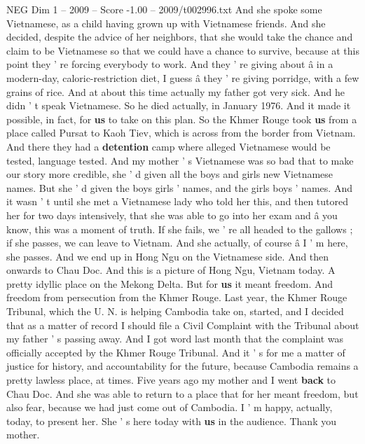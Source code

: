 \begin{textsample}{NEG Dim 1 – 2009 – Score -1.00 – 2009/t002996.txt}
And she spoke some Vietnamese, as a child having grown up with Vietnamese friends.
And she decided, despite the advice of her neighbors, that she would take the chance and claim to be Vietnamese so that we could have a chance to survive, because at this point they ' re forcing everybody to work.
And they ' re giving about â in a modern-day, caloric-restriction diet, I guess â they ' re giving porridge, with a few grains of rice.
And at about this time actually my father got very sick.
And he didn ' t speak Vietnamese.
So he died actually, in January 1976.
And it made it possible, in fact, for \textbf{us} to take on this plan.
So the Khmer Rouge took \textbf{us} from a place called Pursat to Kaoh Tiev, which is across from the border from Vietnam.
And there they had a \textbf{detention} camp where alleged Vietnamese would be tested, language tested.
And my mother ' s Vietnamese was so bad that to make our story more credible, she ' d given all the boys and girls new Vietnamese names.
But she ' d given the boys girls ' names, and the girls boys ' names.
And it wasn ' t until she met a Vietnamese lady who told her this, and then tutored her for two days intensively, that she was able to go into her exam and â you know, this was a moment of truth.
If she fails, we ' re all headed to the gallows ; if she passes, we can leave to Vietnam.
And she actually, of course â I ' m here, she passes.
And we end up in Hong Ngu on the Vietnamese side.
And then onwards to Chau Doc.
And this is a picture of Hong Ngu, Vietnam today.
A pretty idyllic place on the Mekong Delta.
But for \textbf{us} it meant freedom.
And freedom from persecution from the Khmer Rouge.
Last year, the Khmer Rouge Tribunal, which the U.
N. is helping Cambodia take on, started, and I decided that as a matter of record I should file a Civil Complaint with the Tribunal about my father ' s passing away.
And I got word last month that the complaint was officially accepted by the Khmer Rouge Tribunal.
And it ' s for me a matter of justice for history, and accountability for the future, because Cambodia remains a pretty lawless place, at times.
Five years ago my mother and I went \textbf{back} to Chau Doc.
And she was able to return to a place that for her meant freedom, but also fear, because we had just come out of Cambodia.
I ' m happy, actually, today, to present her.
She ' s here today with \textbf{us} in the audience.
Thank you mother.

\end{textsample}
